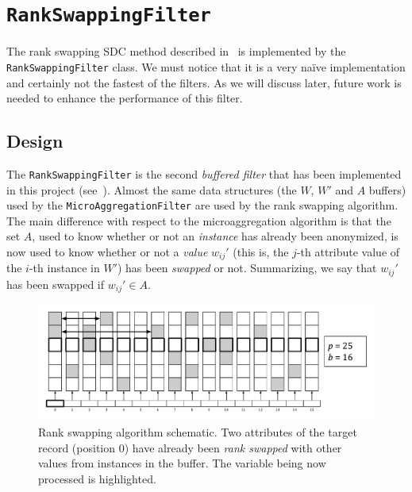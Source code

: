 \section{\texttt{RankSwappingFilter}}
\label{Implementation:RankSwapping}

The rank swapping SDC method described in~ is implemented by the \texttt{RankSwappingFilter} class. We must notice that it is a very naïve implementation and certainly not the fastest of the filters. As we will discuss later, future work is needed to enhance the performance of this filter.

\subsection{Design}
\label{Implementation:RankSwapping:Design}

The \texttt{RankSwappingFilter} is the second \textit{buffered filter} that has been implemented in this project (see~). Almost the same data structures (the $W$, $W'$ and $A$ buffers) used by the \texttt{MicroAggregationFilter} are used by the rank swapping algorithm. The main difference with respect to the microaggregation algorithm is that the set $A$, used to know whether or not an \textit{instance} has already been anonymized, is now used to know whether or not a \textit{value} $w_{ij}'$ (this is, the $j$-th attribute value of the $i$-th instance in $W'$) has been \textit{swapped} or not. Summarizing, we say that $w_{ij}'$ has been swapped if $w_{ij}' \in A$.

\begin{figure}
\centering
\includegraphics[width=1.0\linewidth]{figures/rank-swapping-schematic-1.pdf}
\caption[Rank swapping algorithm schematic.]{Rank swapping algorithm schematic. Two attributes of the target record (position 0) have already been \textit{rank swapped} with other values from instances in the buffer. The variable being now processed is highlighted.}
\end{figure}

